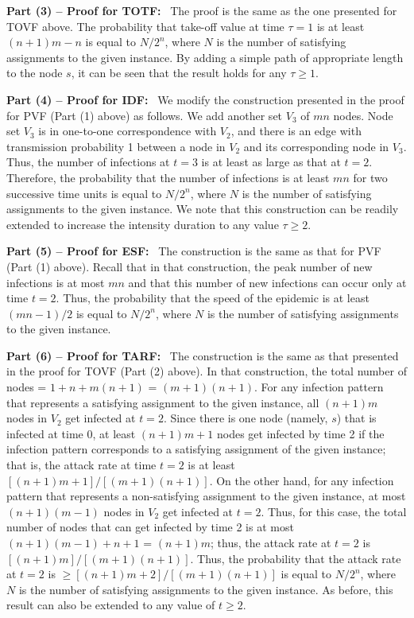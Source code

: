 \medskip
\noindent
\textbf{Part (3) -- Proof for TOTF:}~ The proof is the same as the
one presented for TOVF above. 
The probability that take-off value at time $\tau = 1$ is at least $(n+1)m-n$ is
equal to $N/2^n$, where $N$ is the number of satisfying assignments to the
given \mtsat{} instance.
By adding a simple path of appropriate length to the node $s$, it can be
seen that the result holds for any $\tau \geq 1$. 

\medskip
\noindent
\textbf{Part (4) -- Proof for IDF:}~ We modify 
the construction presented in the proof for PVF (Part (1) above)
as follows.
We add another set $V_3$ of $mn$ nodes.
Node set $V_3$ is in one-to-one correspondence with $V_2$, and there is
an edge with transmission probability 1 between a node in $V_2$ and its
corresponding node in $V_3$.
Thus, the number of infections at $t = 3$ is at least as large as that at $t = 2$.
Therefore, the probability that the number of infections is at least $mn$ for
two successive time units is 
equal to $N/2^n$, where $N$ is the number of satisfying assignments to the
given \mtsat{} instance.
We note that this construction can be readily extended to increase the intensity
duration to any value $\tau \geq 2$.

\medskip
\noindent
\textbf{Part (5) -- Proof for ESF:}~ The construction is the same
as that for PVF (Part (1) above).
Recall that in that construction,
the peak number of new infections 
is at most $mn$ and that this number of new infections can occur
only at time $t = 2$. 
Thus, the probability that the speed of the epidemic is at least
$(mn-1)/2$ is equal to $N/2^n$, where $N$ is the number of 
satisfying assignments to the given \mtsat{} instance.


\medskip
\noindent
\textbf{Part (6) -- Proof for TARF:}~ The construction is the same
as that presented in the proof for TOVF (Part (2) above). 
In that construction, the total number of nodes = $1 + n + m(n+1)$ = $(m+1)(n+1)$. 
For any infection pattern that represents a satisfying assignment to the
given \mtsat{} instance, all $(n+1)m$ nodes in $V_2$ get infected 
at $t = 2$. 
Since there is one node (namely, $s$) that is infected at time 0,
at least $(n+1)m+1$ nodes get infected by time 2 if the infection
pattern corresponds to a satisfying assignment of the given \mtsat{}
instance; that is, the attack rate at time $t = 2$ is at least $[(n+1)m+1]/[(m+1)(n+1)]$.
On the other hand,
for any infection pattern that represents a non-satisfying assignment to the
given \mtsat{} instance, at most $(n+1)(m-1)$ nodes in $V_2$ get infected 
at $t = 2$. 
Thus, for this case, the total number of nodes that can get infected by
time 2 is at most $(n+1)(m-1) + n+1$ = $(n+1)m$; thus, the attack rate
at $t = 2$ is $[(n+1)m]/[(m+1)(n+1)]$.
Thus, the probability that the attack rate at $t = 2$ is $\geq [(n+1)m+2]/[(m+1)(n+1)]$ is
equal to $N/2^n$, where $N$ is the number of satisfying assignments to the
given \mtsat{} instance. 
As before, this result can also be extended to any value of $t \geq 2$. \QED


